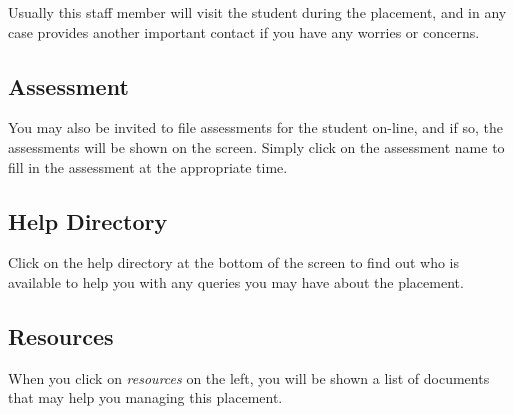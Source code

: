 \documentclass{article}
\begin{document}
Usually this staff member will visit the student during the placement, and in any case
provides another important contact if you have any worries or concerns.

\subsection{Assessment}

You may also be invited to file assessments for the student on-line, and if so, the
assessments will be shown on the screen. Simply click on the assessment name to fill
in the assessment at the appropriate time.

\subsection{Help Directory}

Click on the help directory at the bottom of the screen to find out who is available
to help you with any queries you may have about the placement.

\subsection{Resources}

When you click on \emph{resources} on the left, you will be shown a list of documents
that may help you managing this placement.
\end{document}
